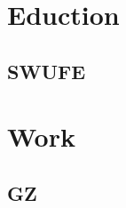 \documentclass{my_cv}
\begin{document}
\section{Eduction}
\subsection{SWUFE}

\section{Work}
\subsection{GZ}
\end{document}
